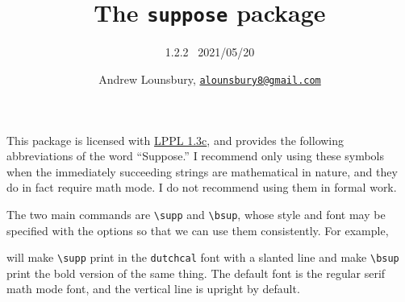 \documentclass{article}
\begin{document}
\title{The \texttt{suppose} package}
\author{1.2.2 \ 2021/05/20}
\date{
    Andrew Lounsbury, \texttt{\href{mailto:alounsbury8@gmail.com}{alounsbury8@gmail.com}}
}
\maketitle

This package is licensed with \href{https://ctan.org/license/lppl1.3c}{LPPL 1.3c}, and provides the following abbreviations of the word ``Suppose.'' I recommend only using these symbols when the immediately succeeding strings are mathematical in nature, and they do in fact require math mode. I do not recommend using them in formal work. \par
The two main commands are \texttt{\textbackslash supp} and \texttt{\textbackslash bsup}, whose style and font may be specified with the options so that we can use them consistently. For example, 
\begin{center}
\end{center}
will make \texttt{\textbackslash supp} print in the \texttt{dutchcal} font with a slanted line and make \texttt{\textbackslash bsup} print the bold version of the same thing. The default font is the regular serif math mode font, and the vertical line is upright by default. 
\end{document}
